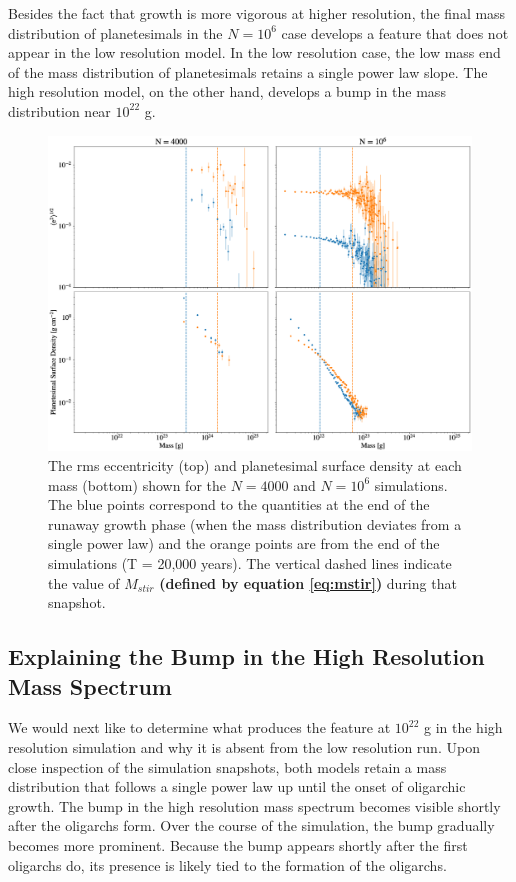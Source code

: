 Besides the fact that growth is more vigorous at higher resolution, the final mass distribution of planetesimals in the $N = 10^{6}$ 
case develops a feature that does not appear in the low resolution model. In the low resolution case, the low mass end of the 
mass distribution of planetesimals retains a single power law slope. The high resolution model, on the other hand, develops a 
bump in the mass distribution near $10^{22}$ g.

\begin{figure}
    \includegraphics[width=\textwidth]{figures/plSS/ecc_den_evo.eps}
    \caption{The rms eccentricity (top) and planetesimal surface density at each mass (bottom) shown for the $N = 4000$ and 
    $N = 10^6$ simulations. The blue points correspond to the quantities at the end of the runaway growth phase (when the 
    mass distribution deviates from a single power law) and the orange points are from the end of the simulations (T = 20,000 
    years). The vertical dashed lines indicate the value of $M_{stir}$ \textbf{(defined by equation \ref{eq:mstir})} during that snapshot.}
    \label{fig:ecc_den_evo}
\end{figure}

\subsection{Explaining the Bump in the High Resolution Mass Spectrum}\label{sec:bump}

We would next like to determine what produces the feature at $10^{22}$ g in the high resolution simulation and why it is absent 
from the low resolution run. Upon close inspection of the simulation snapshots, both models retain a mass distribution that 
follows a single power law up until the onset of oligarchic growth. The bump in the high resolution mass spectrum becomes 
visible shortly after the oligarchs form. Over the course of the simulation, the bump gradually becomes more prominent. Because 
the bump appears shortly after the first oligarchs do, its presence is likely tied to the formation of the oligarchs.

